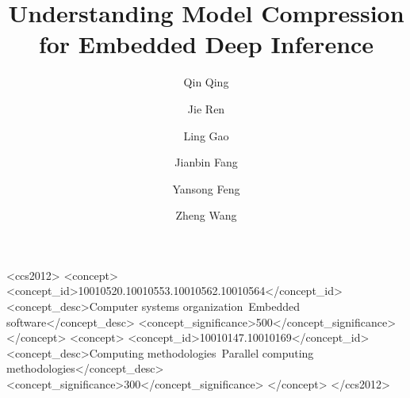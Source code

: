 \documentclass[10pt, conference, letterpaper]{IEEEtran}
\begin{document}
\title{Understanding Model Compression for Embedded Deep Inference}






\author{Qin Qing}
\author{Jie Ren}
 
\author{Ling Gao}

\author{Jianbin Fang}

\author{Yansong Feng}

\author{Zheng Wang}




%
%
\begin{CCSXML}
<ccs2012> <concept> <concept_id>10010520.10010553.10010562.10010564</concept_id> <concept_desc>Computer systems organization~Embedded
software</concept_desc> <concept_significance>500</concept_significance> </concept> <concept> <concept_id>10010147.10010169</concept_id>
<concept_desc>Computing methodologies~Parallel computing methodologies</concept_desc> <concept_significance>300</concept_significance>
</concept> </ccs2012>
\end{CCSXML}


 


\renewcommand{\shortauthors}{Q. Qing et al.}


\maketitle













\end{document}
